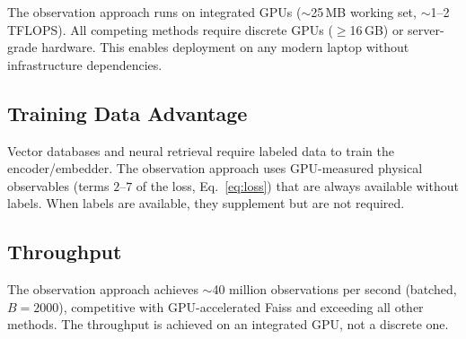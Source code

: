 \documentclass[11pt,twocolumn,a4paper]{article}
\begin{document}
The observation approach runs on integrated GPUs ($\sim$25\,MB working
set, $\sim$1--2\,TFLOPS). All competing methods require discrete GPUs
($\geq$16\,GB) or server-grade hardware. This enables deployment on
any modern laptop without infrastructure dependencies.

\subsection{Training Data Advantage}

Vector databases and neural retrieval require labeled data to train
the encoder/embedder. The observation approach uses GPU-measured
physical observables (terms $2$--$7$ of the loss, Eq.~\ref{eq:loss})
that are always available without labels. When labels are available,
they supplement but are not required.

\subsection{Throughput}

The observation approach achieves $\sim$40 million observations per
second (batched, $B = 2000$), competitive with GPU-accelerated
Faiss \citep{johnson2019} and exceeding all other methods. The
throughput is achieved on an integrated GPU, not a discrete one.
\end{document}
